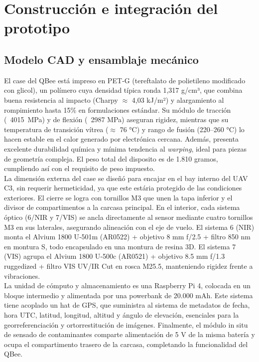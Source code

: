   \section{Construcción e integración del prototipo}
  \subsection{Modelo CAD y ensamblaje mecánico}

    El case del QBee está impreso en PET‑G (tereftalato de polietileno modificado con glicol), un polímero cuya densidad típica ronda 1,317 g/cm³, que combina buena resistencia al impacto (Charpy $\approx$ 4,03 kJ/m²) y alargamiento al rompimiento hasta 15\% en formulaciones estándar. Su módulo de tracción (~4015 MPa) y de flexión (~2987 MPa) aseguran rigidez, mientras que su temperatura de transición vítrea ($\approx$ 76 °C) y rango de fusión (220–260 °C) lo hacen estable en el calor generado por electrónica cercana. Además, presenta excelente durabilidad química y mínima tendencia al \emph{warping}, ideal para piezas de geometría compleja. El peso total del disposito es de 1.810 gramos, cumpliendo así con el requisito de peso impuesto.\\

    \noindent La dimensión externa del case se diseñó para encajar en el bay interno del UAV C3, sin requerir hermeticidad, ya que este estária protegido de las condiciones exteriores. El cierre se logra con tornillos M3 que unen la tapa inferior y el divisor de compartimentos a la carcasa principal. En el interior, cada sistema óptico (6/NIR y 7/VIS) se ancla directamente al sensor mediante cuatro tornillos M3 en sus laterales, asegurando alineación con el eje de vuelo. El sistema 6 (NIR) monta el Alvium 1800 U‑501m (AR0522) + objetivo 8 mm f/2.5 + filtro 850 nm en montura S, todo encapsulado en una montura de resina 3D. El sistema 7 (VIS) agrupa el Alvium 1800 U‑500c (AR0521) + objetivo 8.5 mm f/1.3 ruggedized + filtro VIS UV/IR Cut en rosca M25.5, manteniendo rigidez frente a vibraciones.\\
    
    \noindent La unidad de cómputo y almacenamiento es una Raspberry Pi 4, colocada en un bloque intermedio y alimentada por una powerbank de 20.000 mAh. Este sistema tiene acoplado un hat de GPS, que suministra al sistema de metadatos de fecha, hora UTC, latitud, longitud, altitud y ángulo de elevación, esenciales para la georreferenciación y ortorrestitución de imágenes. Finalmente, el módulo in situ de sensado de contaminantes comparte alimentación de 5 V de la misma batería y ocupa el compartimento trasero de la carcasa, completando la funcionalidad del QBee.\\
    
